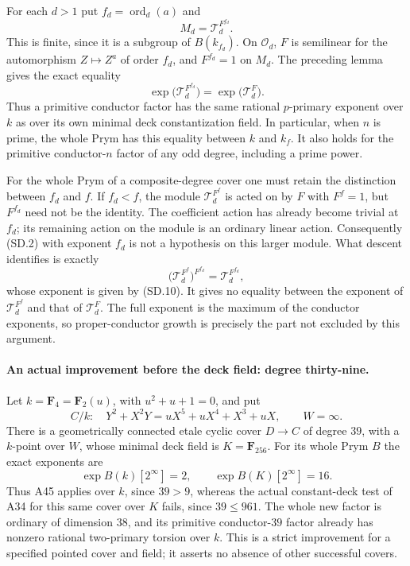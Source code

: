 \documentclass[11pt,a4paper]{article}
\providecommand{\mathscr}{\mathcal}
\begin{document}
For each $d>1$ put $f_d=\operatorname{ord}_d(a)$ and
\[
                      M_d=\mathscr T_d^{F^{f_d}}.
\]
This is finite, since it is a subgroup of $B(k_{f_d})$.
On $\mathcal O_d$, $F$ is semilinear for the automorphism
$Z\mapsto Z^a$ of order $f_d$, and $F^{f_d}=1$ on $M_d$.
The preceding lemma gives the exact equality
\[
       \exp\bigl(\mathscr T_d^{F^{f_d}}\bigr)
                    =\exp\bigl(\mathscr T_d^F\bigr).
 \tag{SD.10}
\]
Thus a primitive conductor factor has the same rational
$p$-primary exponent over $k$ as over its own minimal deck
constantization field.  In particular, when $n$ is prime,
the whole Prym has this equality between $k$ and $k_f$.
It also holds for the primitive conductor-$n$ factor of any
odd degree, including a prime power.

For the whole Prym of a composite-degree cover one must retain
the distinction between $f_d$ and $f$.  If $f_d<f$, the module
$\mathscr T_d^{F^f}$ is acted on by $F$ with $F^f=1$, but
$F^{f_d}$ need not be the identity.  The coefficient action
has already become trivial at $f_d$; its remaining action on
the module is an ordinary linear action.  Consequently
(SD.2) with exponent $f_d$ is not a hypothesis on this larger
module.  What descent identifies is exactly
\[
 \bigl(\mathscr T_d^{F^f}\bigr)^{F^{f_d}}
        =\mathscr T_d^{F^{f_d}},
 \tag{SD.11}
\]
whose exponent is given by (SD.10).  It gives no equality
between the exponent of $\mathscr T_d^{F^f}$ and that of
$\mathscr T_d^F$.  The full exponent is the maximum of the
conductor exponents, so proper-conductor growth is precisely
the part not excluded by this argument.


\paragraph{An actual improvement before the deck field: degree thirty-nine.}
Let $k=\mathbf F_4=\mathbf F_2(u)$, with $u^2+u+1=0$, and put
\[
 C/k:\quad Y^2+X^2Y=uX^5+uX^4+X^3+uX,
                       \qquad W=\infty.
 \tag{ND.12}
\]
There is a geometrically connected etale cyclic cover
$D\to C$ of degree $39$, with a $k$-point over $W$, whose
minimal deck field is $K=\mathbf F_{256}$. For its whole Prym
$B$ the exact exponents are
\[
       \exp B(k)[2^\infty]=2,
             \qquad \exp B(K)[2^\infty]=16.
 \tag{ND.13}
\]
Thus A45 applies over $k$, since $39>9$, whereas the actual
constant-deck test of A34 for this same cover over $K$ fails,
since $39\le961$. The whole new factor is ordinary of dimension
$38$, and its primitive conductor-$39$ factor already has
nonzero rational two-primary torsion over $k$. This is a
strict improvement for a specified pointed cover and field;
it asserts no absence of other successful covers.
\end{document}
